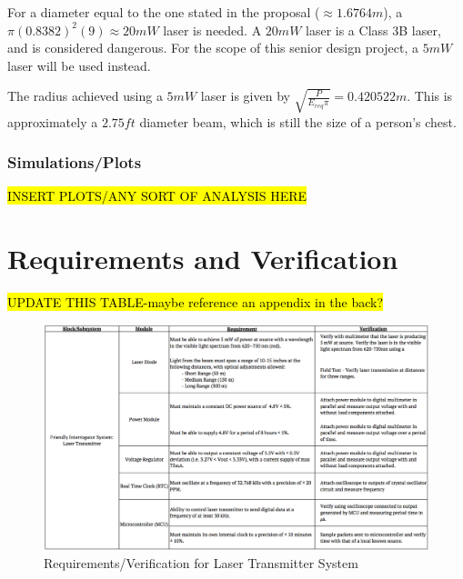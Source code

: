 \documentclass[letterpaper,10pt]{article}
\begin{document}
\begin{spacing}{1.15}
For a diameter equal to the one stated in the proposal ($\approx 1.6764 m$), a $\pi (0.8382)^2(9) \approx 20 mW$ laser is needed. A $20 mW$ laser is a Class 3B laser, and is considered dangerous. For the scope of this senior design project, a $5mW$ laser will be used instead. 

The radius achieved using a $5 mW$ laser is given by $\sqrt{\frac{P}{E_{req} \pi}} = 0.420522 m$. This is approximately a $2.75 ft$ diameter beam, which is still the size of a person's chest.

\subsubsection{Simulations/Plots}
\hl{INSERT PLOTS/ANY SORT OF ANALYSIS HERE}


\section{Requirements and Verification}
\hl{UPDATE THIS TABLE-maybe reference an appendix in the back?}
\begin{figure} [H]
	\centering
	\includegraphics[scale=0.3]{Requirements.png}
	\caption{Requirements/Verification for Laser Transmitter System\label{fig:requirements}}
\end{figure}

\end{spacing}
\end{document}
